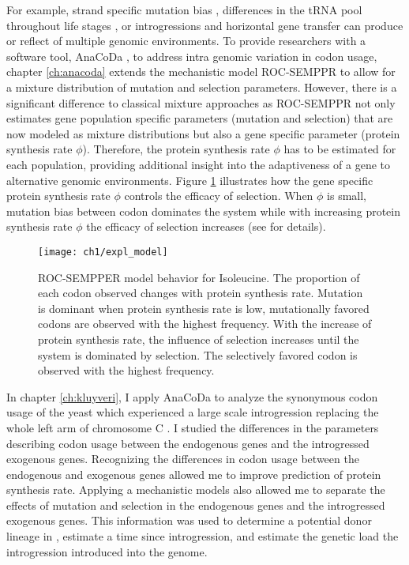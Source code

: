 For example, strand specific mutation bias \citep{Lafay1999,Romero2000}, differences in the tRNA pool throughout life stages \citep{sagi2016}, or introgressions and horizontal gene transfer \citep{medigue1991,lawrence1997} can produce or reflect of multiple genomic environments.
To provide researchers with a software tool, AnaCoDa \cite{landerer2018}, to address intra genomic variation in codon usage, chapter \ref{ch:anacoda} extends the mechanistic model ROC-SEMPPR \cite{gilchrist2015} to allow for a mixture distribution of mutation and selection parameters.
However, there is a significant difference to classical mixture approaches as ROC-SEMPPR not only estimates gene population specific parameters (mutation and selection) that are now modeled as mixture distributions but also a gene specific parameter (protein synthesis rate $\phi$). 
Therefore, the protein synthesis rate $\phi$ has to be estimated for each population, providing additional insight into the adaptiveness of a gene to alternative genomic environments.
Figure \ref{fig:expl_model} illustrates how the gene specific protein synthesis rate $\phi$ controls the efficacy of selection.
When $\phi$ is small, mutation bias between codon dominates the system while with increasing protein synthesis rate $\phi$ the efficacy of selection increases (see \cite{gilchrist2015} for details). 

\singlespacing
\begin{figure}[H]
     \centering
	\texttt{[image: ch1/expl\_model]}
	\caption{ROC-SEMPPER model behavior for Isoleucine.
	The proportion of each codon observed changes with protein synthesis rate.
	Mutation is dominant when protein synthesis rate is low, mutationally favored codons are observed with the highest frequency.
	With the increase of protein synthesis rate, the influence of selection increases until the system is dominated by selection.
	The selectively favored codon is observed with the highest frequency.}
	\label{fig:expl_model}
\end{figure}
\doublespacing

In chapter \ref{ch:kluyveri}, I apply AnaCoDa to analyze the synonymous codon usage of the yeast \kluyveri which experienced a large scale introgression replacing the whole left arm of chromosome C \citep{friedrich2015}.
I studied the differences in the parameters describing codon usage between the endogenous \kluyveri genes and the introgressed exogenous genes.
Recognizing the differences in codon usage between the endogenous and exogenous genes allowed me to improve prediction of protein synthesis rate.
Applying a mechanistic models also allowed me to separate the effects of mutation and selection in the endogenous \kluyveri genes and the introgressed exogenous genes.
This information was used to determine a potential donor lineage in \gossypii, estimate a time since introgression, and estimate the genetic load the introgression introduced into the \kluyveri genome.

